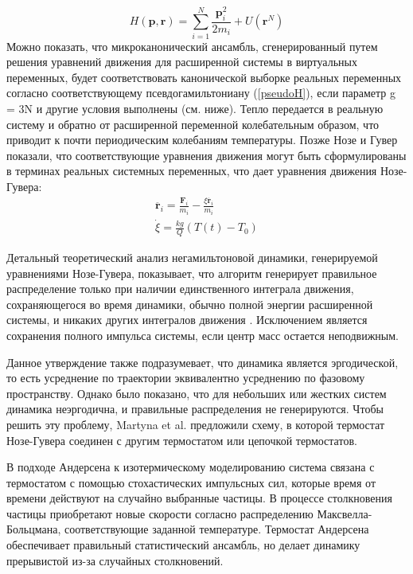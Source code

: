 \begin{equation}
    H({\mathbf p},{\mathbf r})= \sum_{i=1}^{N} \frac{{\mathbf p}_{i}^{2}}{2m_i}+ U({\mathbf r}^N)
\label{pseudoH}
\end{equation}
Можно показать, что микроканонический ансамбль, сгенерированный путем решения уравнений движения для расширенной системы в виртуальных переменных, будет соответствовать канонической выборке реальных переменных согласно соответствующему псевдогамильтониану (\ref{pseudoH}), если параметр g = 3N и другие условия выполнены (см. ниже). Тепло передается в реальную систему и обратно от расширенной переменной колебательным образом, что приводит к почти периодическим колебаниям температуры. 
    Позже Нозе и Гувер показали, что соответствующие уравнения движения могут быть сформулированы в терминах реальных системных переменных, что дает уравнения движения Нозе-Гувера:
\begin{eqnarray}
    \ddot{{\mathbf r}_i} = \frac{{\mathbf F}_i}{m_i} - \frac{\xi \dot{{\mathbf r}_i}}{m_i} \nonumber \\
    \dot{\xi}= \frac{kg}{Q}(T(t)-T_0)
\end{eqnarray}

    Детальный теоретический анализ негамильтоновой динамики, генерируемой уравнениями Нозе-Гувера, показывает, что алгоритм генерирует правильное распределение только при наличии единственного интеграла движения, сохраняющегося во время динамики, обычно полной энергии расширенной системы, и никаких других интегралов движения \cite{frenkel_understanding_2002}. Исключением является сохранения полного импульса системы, если центр масс остается неподвижным.
    
    Данное утверждение также подразумевает, что динамика является эргодической, то есть усреднение по траектории эквивалентно усреднению по фазовому пространству. Однако было показано, что для небольших или жестких систем динамика неэргодична, и правильные распределения не генерируются. Чтобы решить эту проблему, Martyna et al. \cite{martyna_nose-hoover_1992} предложили схему, в которой термостат Нозе-Гувера соединен с другим термостатом или цепочкой термостатов.
    
    В подходе Андерсена к изотермическому моделированию система связана с термостатом с помощью стохастических импульсных сил, которые время от времени действуют на случайно выбранные частицы. В процессе столкновения частицы приобретают новые скорости согласно распределению Максвелла-Больцмана, соответствующие заданной температуре. Термостат Андерсена обеспечивает правильный статистический ансамбль, но делает динамику прерывистой из-за случайных столкновений.
    
